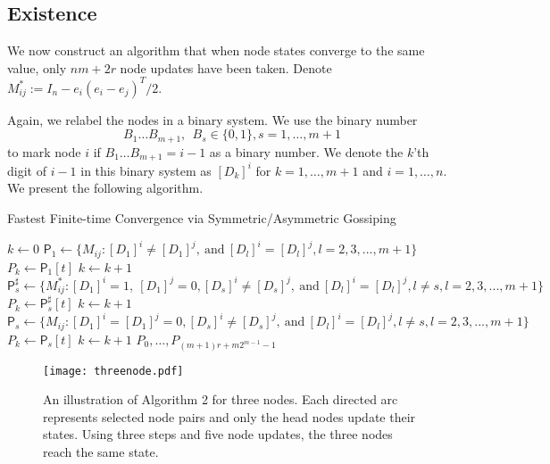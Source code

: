 \documentclass[a4paper, 11pt]{article}
\begin{document}
\subsection{Existence}
We now construct  an algorithm that when node states converge to the same value, only $nm+2r$ node updates  have been taken.
Denote $M^*_{ij}:=I_n-{e_i(e_i-e_j)^T}/{2}$.

Again, we relabel the nodes in a binary system. We  use the binary number
$$
B_1\dots B_{m+1}, \ \ B_s\in\{0,1\}, s=1,\dots,m+1
$$
to mark node $i$ if $B_1\dots B_{m+1}=i-1$ as a binary number. We denote the $k$'th digit of $i-1$ in this binary system as $[D_k]^i$ for $k=1,\dots,m+1$ and $i=1,\dots, n$. We present the following algorithm.



\begin{algorithm}[htb]
\caption{Fastest Finite-time Convergence via  Symmetric/Asymmetric Gossiping}
\label{alg:Framwork}
\begin{algorithmic}[1]
\STATE $k\gets 0$
\STATE $\mathsf{P}_1\gets \big\{M_{ij}: [D_1]^i \neq [D_1]^j,\ \mbox{and}\ [D_l]^i=[D_l]^j, l=2, 3,..., m+1\big\}$
        \STATE $P_k \gets \mathsf{P}_1[t]$
        \STATE $k\gets k+1$
    \ENDFOR
{}
    \STATE  $\mathsf{P}_s^\sharp\gets \big\{M^*_{ij}: [D_1]^i=1,\ [D_1]^j=0, [D_s]^i\neq [D_s]^j, \ \mbox{and}\ [D_l]^i=[D_l]^j, l\neq s, l=2, 3,...,m+1 \big\}$
        \STATE $P_k \gets \mathsf{P}_s^\sharp[t]$
        \STATE $k\gets k+1$
    \ENDFOR
    \STATE $\mathsf{P}_s\gets \big\{M_{ij}: [D_1]^i=[D_1]^j=0, [D_s]^i \neq [D_s]^j, \ \mbox{and}\ [D_l]^i=[D_l]^j, l\neq s, l=2,3,..., m+1\big\}$
        \STATE $P_k \gets \mathsf{P}_s[t]$
        \STATE $k\gets k+1$
    \ENDFOR
\ENDFOR
\RETURN $P_0, \dots, P_{(m+1)r+m2^{m-1}-1}$
\end{algorithmic}
\end{algorithm}

\begin{figure*}[t]
\begin{center}
\texttt{[image: threenode.pdf]}
\caption{An illustration of Algorithm 2 for three nodes. Each directed arc represents selected node pairs and only the head nodes update their states. Using three steps and five node updates, the three nodes reach the same state. } \label{fig2}
\end{center}
\end{figure*}
\end{document}
